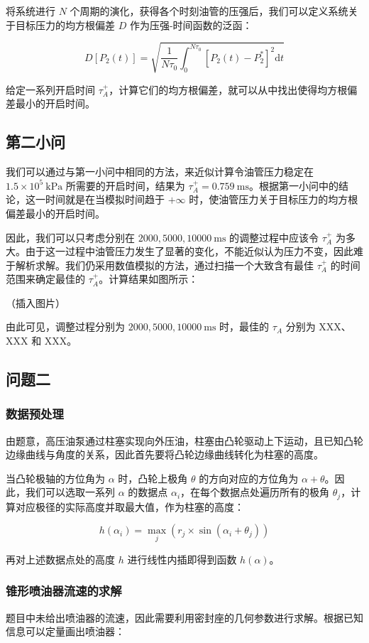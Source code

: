 \documentclass[18pt]{ctexart}
\newcommand{\prb}{\times 10^5~\mathrm{kPa}}
\newcommand{\tim}{~\mathrm{ms}}
\begin{document}
将系统进行 $N$ 个周期的演化，获得各个时刻油管的压强后，我们可以定义系统关于目标压力的均方根偏差 $D$ 作为压强-时间函数的泛函：

$$
D[P_2(t)]=\sqrt{\frac1{N\tau_0}\int_0^{N\tau_0}
\left[P_2(t)-P_2^*\right]^2\mathrm dt}
$$

给定一系列开启时间 $\tau_A^+$，计算它们的均方根偏差，就可以从中找出使得均方根偏差最小的开启时间。
\subsection{第二小问}
我们可以通过与第一小问中相同的方法，来近似计算令油管压力稳定在 $1.5\prb$ 所需要的开启时间，结果为 $\tau_A^+ = 0.759\tim$。根据第一小问中的结论，这一时间就是在当模拟时间趋于 $+\infty$ 时，使油管压力关于目标压力的均方根偏差最小的开启时间。

因此，我们可以只考虑分别在 $2000, 5000, 10000\tim$ 的调整过程中应该令 $\tau_A^+$ 为多大。由于这一过程中油管压力发生了显著的变化，不能近似认为压力不变，因此难于解析求解。我们仍采用数值模拟的方法，通过扫描一个大致含有最佳 $\tau_A^+$ 的时间范围来确定最佳的 $\tau_A^+$。计算结果如图所示：

（插入图片）

由此可见，调整过程分别为 $2000, 5000, 10000\tim$ 时，最佳的 $\tau_A$ 分别为 XXX、XXX 和 XXX。
\subsection{问题二}
\subsubsection{数据预处理}
由题意，高压油泵通过柱塞实现向外压油，柱塞由凸轮驱动上下运动，且已知凸轮边缘曲线与角度的关系，因此首先要将凸轮边缘曲线转化为柱塞的高度。

当凸轮极轴的方位角为 $\alpha$ 时，凸轮上极角 $\theta$ 的方向对应的方位角为 $\alpha + \theta$。因此，我们可以选取一系列 $\alpha$ 的数据点 $\alpha_i$，在每个数据点处遍历所有的极角 $\theta_j$，计算对应极径的实际高度并取最大值，作为柱塞的高度：

$$
h(\alpha_i)=\max_j(r_j\times \sin(\alpha_i+\theta_j))
$$

再对上述数据点处的高度 $h$ 进行线性内插即得到函数 $h(\alpha)$。
\subsubsection{锥形喷油器流速的求解}

题目中未给出喷油器的流速，因此需要利用密封座的几何参数进行求解。根据已知信息可以定量画出喷油器：
\end{document}

